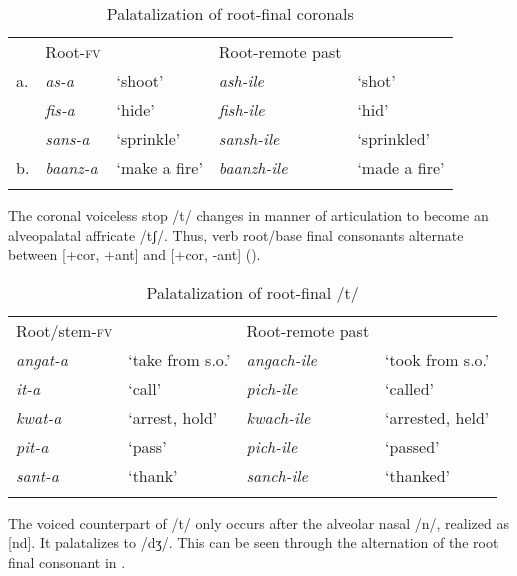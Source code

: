 \documentclass[output=paper]{langsci/langscibook}
\begin{document}
\begin{table}
\begin{tabular}{lllll}
\lsptoprule
 & Root-\textsc{fv} &  & Root-remote past & \\
a. & \textit{as-a} & `shoot' & \textit{ash-ile} & `shot' \\
 & \textit{fis-a} & `hide' & \textit{fish-ile} & `hid' \\
 & \textit{sans-a} & `sprinkle' & \textit{sansh-ile} & `sprinkled' \\
b. & \textit{baanz-a} & `make a fire' & \textit{baanzh-ile} & `made a fire' \\

\lspbottomrule
\end{tabular}

\caption{Palatalization of root-final coronals}
\label{tab:9.kawasha}

 \end{table}


The coronal voiceless stop /t/ changes in manner of articulation to become an alveopalatal affricate /tʃ/. Thus, verb root/base final consonants alternate between [+cor, +ant] and [+cor, -ant] ().


\begin{table}
\begin{tabular}{llll}
\lsptoprule
Root/stem-\textsc{fv} &  & Root-remote past & \\
\textit{angat-a} & `take from s.o.' & \textit{angach-ile} & `took from s.o.' \\
\textit{it-a} & `call' & \textit{pich-ile} & `called' \\
\textit{kwat-a} & `arrest, hold' & \textit{kwach-ile} & `arrested, held' \\
\textit{pit-a} & `pass' & \textit{pich-ile} & `passed' \\
\textit{sant-a} & `thank' & \textit{sanch-ile} & `thanked' \\

\lspbottomrule
\end{tabular}

\caption{Palatalization of root-final /t/}
\label{tab:10.kawasha}

 \end{table}




The voiced counterpart of /t/ only occurs after the alveolar nasal /n/, realized as [nd]. It palatalizes to /dʒ/. This can be seen through the alternation of the root final consonant in .
\end{document}
